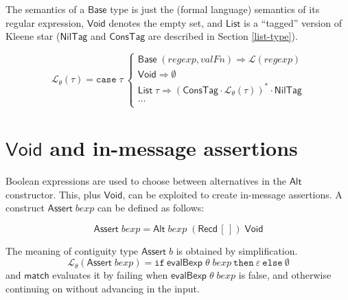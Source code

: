 \documentclass[a4paper,UKenglish,cleveref, autoref, thm-restate]{lipics-v2021}
\newcommand{\konst}[1]{\ensuremath{\mathsf{#1}}}
\newcommand{\Lang}[1]{\ensuremath{{\mathcal L}({#1})}}
\newcommand{\LangTheta}[1]{\ensuremath{{\mathcal L}_{\theta}({#1})}}
\newcommand{\itelse}[3]{\mbox{$\mathtt{if}\ {#1}\ \mathtt{then}\ {#2}\ \mathtt{else}\ {#3}$}}
\begin{document}
\begin{definition}

The semantics of a \konst{Base} type is just the (formal language)
semantics of its regular expression, \konst{Void} denotes the empty
set, and \konst{List} is a ``tagged'' version of Kleene star
(\konst{NilTag} and \konst{ConsTag} are described in Section
\ref{list-type}).

\[
\LangTheta{\tau} =
\mathtt{case}\; \tau\
 \left\{
 \begin{array}{l}
 \konst{Base}\; (\mathit{regexp}, \mathit{valFn}) \Rightarrow  \Lang{\mathit{regexp}} \\

 \konst{Void} \Rightarrow  \emptyset \\

 \konst{List}\; \tau \Rightarrow
   (\konst{ConsTag}\cdot \LangTheta{\tau})^{*} \cdot \konst{NilTag} \\

 \ldots  \\

 \end{array}
 \right.
\]
\end{definition}

\section{\konst{Void} and in-message assertions}\label{assert}

Boolean expressions are used to choose between alternatives in the
\konst{Alt} constructor.  This, plus \konst{Void}, can be exploited to
create in-message assertions. A construct
$\konst{Assert}\;\mathit{bexp}$ can be defined as follows:

\begin{definition}[\konst{Assert}]

\[
  \konst{Assert}\; \mathit{bexp} =
     \konst{Alt} \; \mathit{bexp} \; (\konst{Recd}\, [\,]) \; \konst{Void}
\]

\end{definition}

The meaning of contiguity type $\konst{Assert}\;b$ is obtained by simplification.
%
\[
\LangTheta{\konst{Assert}\; \mathit{bexp}} =
 \itelse{\konst{evalBexp}\;\theta\;\mathit{bexp}}
        {\varepsilon} {\emptyset}
\]
%
and \konst{match} evaluates it by failing when
$\konst{evalBexp}\;\theta\;\mathit{bexp}$ is false, and otherwise
continuing on without advancing in the input.
\end{document}
